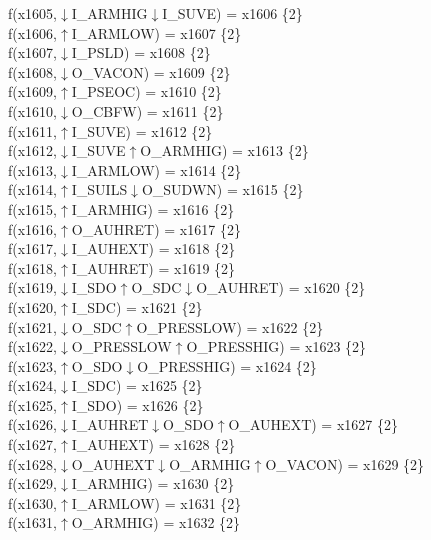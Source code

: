 f(x1605,$\downarrow$I\_ARMHIG$\downarrow$I\_SUVE) = x1606 \{2\} \\  
f(x1606,$\uparrow$I\_ARMLOW) = x1607 \{2\} \\  
f(x1607,$\downarrow$I\_PSLD) = x1608 \{2\} \\  
f(x1608,$\downarrow$O\_VACON) = x1609 \{2\} \\  
f(x1609,$\uparrow$I\_PSEOC) = x1610 \{2\} \\  
f(x1610,$\downarrow$O\_CBFW) = x1611 \{2\} \\  
f(x1611,$\uparrow$I\_SUVE) = x1612 \{2\} \\  
f(x1612,$\downarrow$I\_SUVE$\uparrow$O\_ARMHIG) = x1613 \{2\} \\  
f(x1613,$\downarrow$I\_ARMLOW) = x1614 \{2\} \\  
f(x1614,$\uparrow$I\_SUILS$\downarrow$O\_SUDWN) = x1615 \{2\} \\  
f(x1615,$\uparrow$I\_ARMHIG) = x1616 \{2\} \\  
f(x1616,$\uparrow$O\_AUHRET) = x1617 \{2\} \\  
f(x1617,$\downarrow$I\_AUHEXT) = x1618 \{2\} \\  
f(x1618,$\uparrow$I\_AUHRET) = x1619 \{2\} \\  
f(x1619,$\downarrow$I\_SDO$\uparrow$O\_SDC$\downarrow$O\_AUHRET) = x1620 \{2\} \\  
f(x1620,$\uparrow$I\_SDC) = x1621 \{2\} \\  
f(x1621,$\downarrow$O\_SDC$\uparrow$O\_PRESSLOW) = x1622 \{2\} \\  
f(x1622,$\downarrow$O\_PRESSLOW$\uparrow$O\_PRESSHIG) = x1623 \{2\} \\  
f(x1623,$\uparrow$O\_SDO$\downarrow$O\_PRESSHIG) = x1624 \{2\} \\  
f(x1624,$\downarrow$I\_SDC) = x1625 \{2\} \\  
f(x1625,$\uparrow$I\_SDO) = x1626 \{2\} \\  
f(x1626,$\downarrow$I\_AUHRET$\downarrow$O\_SDO$\uparrow$O\_AUHEXT) = x1627 \{2\} \\  
f(x1627,$\uparrow$I\_AUHEXT) = x1628 \{2\} \\  
f(x1628,$\downarrow$O\_AUHEXT$\downarrow$O\_ARMHIG$\uparrow$O\_VACON) = x1629 \{2\} \\  
f(x1629,$\downarrow$I\_ARMHIG) = x1630 \{2\} \\  
f(x1630,$\uparrow$I\_ARMLOW) = x1631 \{2\} \\  
f(x1631,$\uparrow$O\_ARMHIG) = x1632 \{2\} \\  
